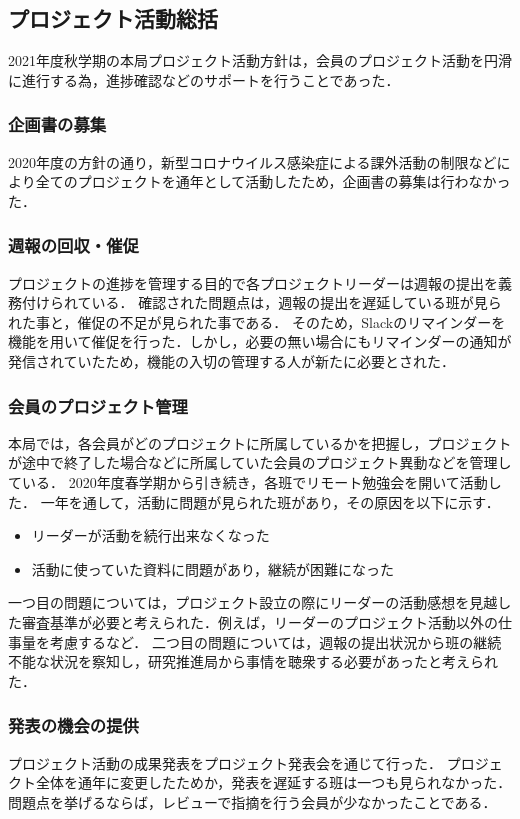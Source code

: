 \subsection*{プロジェクト活動総括}


2021年度秋学期の本局プロジェクト活動方針は，会員のプロジェクト活動を円滑に進行する為，進捗確認などのサポートを行うことであった．

\subsubsection*{企画書の募集}

2020年度の方針の通り，新型コロナウイルス感染症による課外活動の制限などにより全てのプロジェクトを通年として活動したため，企画書の募集は行わなかった．

\subsubsection*{週報の回収・催促}

プロジェクトの進捗を管理する目的で各プロジェクトリーダーは週報の提出を義務付けられている．
確認された問題点は，週報の提出を遅延している班が見られた事と，催促の不足が見られた事である．
そのため，Slackのリマインダーを機能を用いて催促を行った．しかし，必要の無い場合にもリマインダーの通知が発信されていたため，機能の入切の管理する人が新たに必要とされた．

\subsubsection*{会員のプロジェクト管理}

本局では，各会員がどのプロジェクトに所属しているかを把握し，プロジェクトが途中で終了した場合などに所属していた会員のプロジェクト異動などを管理している．
2020年度春学期から引き続き，各班でリモート勉強会を開いて活動した．
一年を通して，活動に問題が見られた班があり，その原因を以下に示す．
\begin{itemize}
\item リーダーが活動を続行出来なくなった
\item 活動に使っていた資料に問題があり，継続が困難になった
\end{itemize}
一つ目の問題については，プロジェクト設立の際にリーダーの活動感想を見越した審査基準が必要と考えられた．例えば，リーダーのプロジェクト活動以外の仕事量を考慮するなど．
二つ目の問題については，週報の提出状況から班の継続不能な状況を察知し，研究推進局から事情を聴衆する必要があったと考えられた．

\subsubsection*{発表の機会の提供}
プロジェクト活動の成果発表をプロジェクト発表会を通じて行った．
プロジェクト全体を通年に変更したためか，発表を遅延する班は一つも見られなかった．
問題点を挙げるならば，レビューで指摘を行う会員が少なかったことである．
